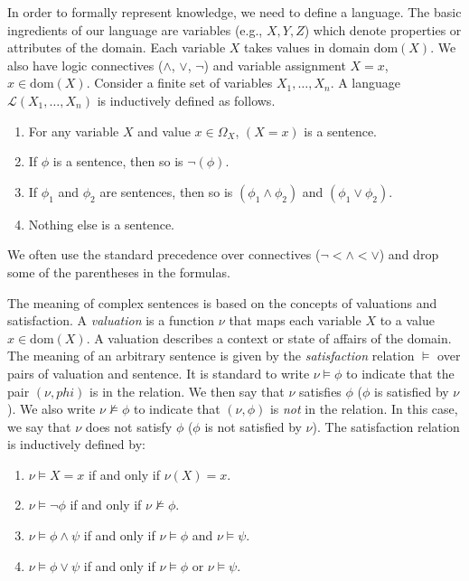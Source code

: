 \documentclass{amsart}
\newcommand{\set}[1]{\mathcal{#1}}
\begin{document}
In order to formally represent knowledge, we need to define a
language. The basic ingredients of our language are variables (e.g.,
$X,Y,Z$) which denote properties or attributes of the domain. Each
variable $X$ takes values in domain $\text{dom}(X)$. We also have logic
connectives ($\wedge$, $\vee$, $\neg$) and variable assignment $X=x$,
$x \in \text{dom}(X)$. Consider a finite set of variables
$X_1,\dotsc,X_n$. A language $\set{L}(X_1,\dotsc,X_n)$ is inductively
defined as follows.
\begin{enumerate}
\item For any variable $X$ and value $x \in \Omega_X$, $(X=x)$ is a
  sentence.
\item If $\phi$ is a sentence, then so is $\neg (\phi)$.
\item If $\phi_1$ and $\phi_2$ are sentences, then so is $(\phi_1 \wedge \phi_2)$ and $(\phi_1 \vee \phi_2)$.
\item Nothing else is a sentence.
\end{enumerate}

We often use the standard precedence over connectives
($\neg < \wedge < \vee$) and drop some of the parentheses in the
formulas.

The meaning of complex sentences is based on the concepts of valuations
and satisfaction. A \emph{valuation} is a function $\nu$ that maps each
variable $X$ to a value $x \in \text{dom}(X)$. A valuation describes a
context or state of affairs of the domain. The meaning of an arbitrary
sentence is given by the \emph{satisfaction} relation $\models$ over
pairs of valuation and sentence. It is standard to write
$\nu \models \phi$ to indicate that the pair $(\nu, phi)$ is in the
relation. We then say that $\nu$ satisfies $\phi$ ($\phi$ is satisfied
by $\nu$). We also write $\nu \not\models \phi$ to indicate that
$(\nu,\phi)$ is \emph{not} in the relation. In this case, we say that
$\nu$ does not satisfy $\phi$ ($\phi$ is not satisfied by $\nu$). The satisfaction relation is inductively defined by:
\begin{enumerate}
\item $\nu \models X=x$ if and only if $\nu(X)=x$.
\item $\nu \models \neg \phi$ if and only if $\nu \not\models \phi$.
\item $\nu \models \phi \wedge \psi$ if and only if
  $\nu \models \phi$ and $\nu \models \psi$.
\item $\nu \models \phi \vee \psi$ if and only if
  $\nu \models \phi$ or $\nu \models \psi$.
\end{enumerate}
\end{document}
